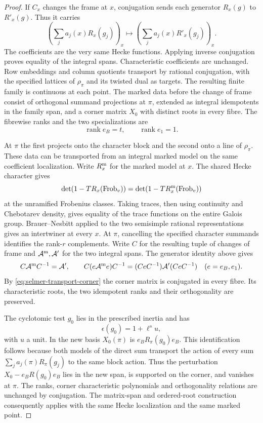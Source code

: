 \begin{proof}
If \(C_x\) changes the frame at \(x\), conjugation sends each generator
\(R_x(g)\) to \(R'_x(g)\). Thus it carries
\[
 \left(\sum_j a_j(x)R_x(g_j)\right)_x
 \longmapsto\left(\sum_j a_j(x)R'_x(g_j)\right)_x .
\]
The coefficients are the very same Hecke functions. Applying
inverse conjugation proves equality of the integral spans.
Characteristic coefficients are unchanged. Row embeddings and
column quotients transport by rational conjugation, with the
specified lattices of \(\rho_\pi\) and its twisted dual as targets.
The resulting finite family is continuous at each point.
\label{cor:split-selmer-1}
The marked data before the change of frame consist of
orthogonal summand projections at \(\pi\), extended as integral
idempotents in the family span, and a corner matrix \(X_0\) with
distinct roots in every fibre. The fibrewise ranks and the two specializations are
\[
 \operatorname{rank}e_B=t,\qquad \operatorname{rank}e_1=1.
\]

At \(\pi\) the first projects onto the character block and the second onto a line of \(\rho_\pi\). These data can be
transported from an integral marked model on the same coefficient
localization. Write \(R_x^{\rm m}\) for the marked model at \(x\).
The shared Hecke character gives
\[
 \det(1-TR_x(\operatorname{Frob}_v))
   =\det(1-TR_x^{\rm m}(\operatorname{Frob}_v))
\]
at the unramified Frobenius classes. Taking traces, then using
continuity and Chebotarev density, gives equality of the trace
functions on the entire Galois group. Brauer--Nesbitt applied
to the two semisimple rational representations gives an
intertwiner at every \(x\). At \(\pi\), cancelling the specified
character summands identifies the rank-\(r\) complements.
Write \(C\) for the resulting tuple of changes of frame and
\(\mathcal A^{\rm m},\mathcal A'\) for the two integral spans.
The generator identity above gives
\begin{equation}\label{eq:selmer-transport-corner}
 C\mathcal A^{\rm m} C^{-1}=\mathcal A',\qquad
 C(e\mathcal A^{\rm m}e)C^{-1}
      =(CeC^{-1})\mathcal A'(CeC^{-1})
      \quad(e=e_B,e_1).
\end{equation}
By \eqref{eq:selmer-transport-corner} the corner matrix is conjugated in every fibre. Its
characteristic roots, the two idempotent ranks and their
orthogonality are preserved.  \label{cor:split-selmer-2}

The cyclotomic test
\(g_0\) lies in the prescribed inertia and has
\[
 \epsilon(g_0)=1+\ell^s u,
\]
with \(u\) a unit. In the new basis
\(X_0(\pi)\) is \(e_B R_\pi(g_0)e_B\). This identification follows
because both models of the direct sum transport the action of
every sum \(\sum_j a_j(\pi)R_\pi(g_j)\) to the same block action.
Thus the perturbation \(X_0-e_B R(g_0)e_B\) lies in the new span,
is supported on the corner, and vanishes at \(\pi\). The ranks,
corner characteristic polynomials and orthogonality relations
are unchanged by conjugation. The matrix-span and ordered-root
construction consequently applies with the same Hecke localization
and the same marked point.


\end{proof}
